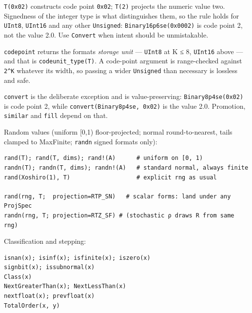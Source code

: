 \begin{tcolorbox}[toptitle=-1mm,bottomtitle=1mm,colback=admonition-warning!50!white,colframe=admonition-warning,title=\textbf{`Unsigned` means code point — at every width}]
\texttt{T(0x02)} constructs code point \texttt{0x02}; \texttt{T(2)} projects the numeric value two. Signedness of the integer type is what distinguishes them, so the rule holds for \texttt{UInt8}, \texttt{UInt16} and any other \texttt{Unsigned}: \texttt{Binary16p6se(0x0002)} is code point 2, not the value 2.0. Use \texttt{Convert} when intent should be unmistakable.

\texttt{codepoint} returns the format{\textquotesingle}s \emph{storage unit} — \texttt{UInt8} at K ≤ 8, \texttt{UInt16} above — and that is \texttt{codeunit\_\allowbreak{}type(T)}. A code-point argument is range-checked against \texttt{2{\textasciicircum}K} whatever its width, so passing a wider \texttt{Unsigned} than necessary is lossless and safe.

\texttt{convert} is the deliberate exception and is value-preserving: \texttt{Binary8p4se(0x02)} is code point 2, while \texttt{convert(\allowbreak{}Binary8p4se, 0x02)} is the value 2.0. Promotion, \texttt{similar} and \texttt{fill} depend on that.

\end{tcolorbox}


Random values (uniform [0,1) floor-projected; normal round-to-nearest, tails clamped to MaxFinite; \texttt{randn} signed formats only):




\nopagebreak[4]
\begin{verbatim}
rand(T); rand(T, dims); rand!(A)      # uniform on [0, 1)
randn(T); randn(T, dims); randn!(A)   # standard normal, always finite
rand(Xoshiro(1), T)                   # explicit rng as usual

rand(rng, T;  projection=RTP_SN)   # scalar forms: land under any ProjSpec
randn(rng, T; projection=RTZ_SF) # (stochastic ρ draws R from same rng)
\end{verbatim}



Classification and stepping:




\nopagebreak[4]
\begin{verbatim}
isnan(x); isinf(x); isfinite(x); iszero(x)
signbit(x); issubnormal(x)
Class(x)
NextGreaterThan(x); NextLessThan(x)
nextfloat(x); prevfloat(x)
TotalOrder(x, y)
\end{verbatim}



